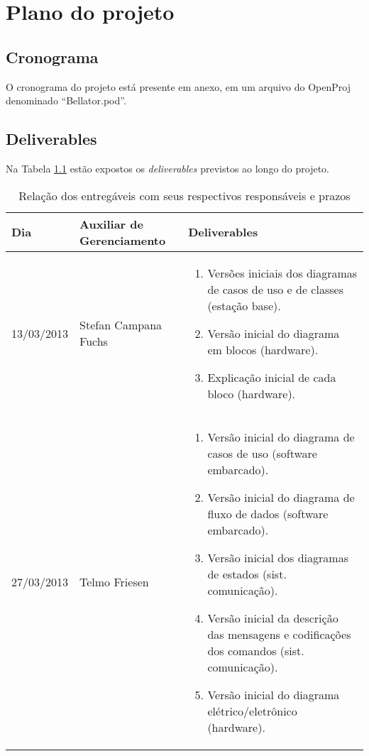 \chapter{Plano do projeto}
\section{Cronograma}
O cronograma do projeto está presente em anexo, em um arquivo do OpenProj denominado ``Bellator.pod''.

\section{Deliverables}

Na Tabela \ref{tab:deliverables1} estão expostos os \textit{deliverables} previstos ao longo do projeto.

\begin{table}[h]
  \centering
  \caption{Relação dos entregáveis com seus respectivos responsáveis e prazos}
  \begin{tabular}{p{3cm}|p{4cm}||p{7cm}}
    \toprule
    \textbf{Dia}   & \textbf{Auxiliar de Gerenciamento} & \textbf{Deliverables} \\
    \hline
    13/03/2013 & Stefan Campana Fuchs & 
    \begin{enumerate}[topsep=0pt, partopsep=0pt, itemsep=0pt]
      \item Versões iniciais dos diagramas de casos de uso e de classes (estação base).
      \item Versão inicial do diagrama em blocos (hardware).
      \item Explicação inicial de cada bloco (hardware).
    \end{enumerate}\\
    \hline
    27/03/2013 & Telmo Friesen & 
    \begin{enumerate}[topsep=0pt, partopsep=0pt, itemsep=0pt]
      \item Versão inicial do diagrama de casos de uso (software embarcado).
      \item Versão inicial do diagrama de fluxo de dados (software embarcado).
      \item Versão inicial dos diagramas de estados (sist. comunicação).
      \item Versão inicial da descrição das mensagens e codificações dos comandos (sist. comunicação).
      \item Versão inicial do diagrama elétrico/eletrônico (hardware).
    \end{enumerate}\\
  \end{tabular}%
  \label{tab:deliverables1}%
\end{table}%


